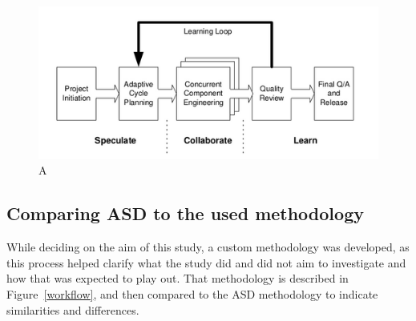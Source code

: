 \begin{figure}
\hspace*{-1cm}
\centering
\includegraphics{figure/asd.png}
\caption{A }
\label{asd}
\end{figure}


\subsection{Comparing ASD to the used methodology}
While deciding on the aim of this study, a custom methodology was developed, as this process helped clarify what the study did and did not aim to investigate and how that was expected to play out. That methodology is described in Figure~\ref{workflow}, and then compared to the ASD methodology to indicate similarities and differences.

